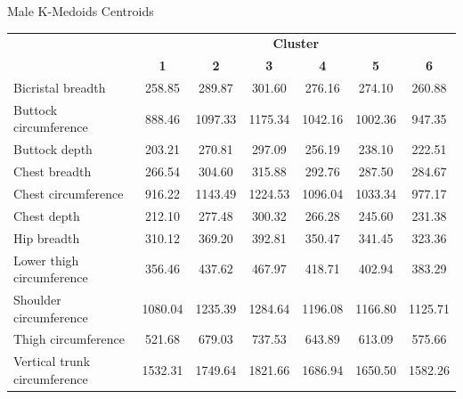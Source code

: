 \documentclass[10pt]{beamer}
\begin{document}
\begin{frame}{Male K-Medoids Centroids}
	\scriptsize
	\centering
	\begin{tabular}{lcccccc}
		\cline{2-7}
		                             & \multicolumn{6}{c}{\textbf{Cluster}}                                                                             \\
		                             & \textbf{1}                           & \textbf{2}   & \textbf{3}   & \textbf{4}   & \textbf{5}    & \textbf{6}   \\
		\hline\hline
		Bicristal breadth            & 258.85                               & 289.87       & 301.60       & 276.16       & 274.10        & 260.88       \\
		Buttock circumference        & 888.46                               & 1097.33      & 1175.34      & 1042.16      & 1002.36       & 947.35       \\
		Buttock depth                & 203.21                               & 270.81       & 297.09       & 256.19       & 238.10        & 222.51       \\
		Chest breadth                & 266.54                               & 304.60       & 315.88       & 292.76       & 287.50        & 284.67       \\
		Chest circumference          & 916.22                               & 1143.49      & 1224.53      & 1096.04      & 1033.34       & 977.17       \\
		Chest depth                  & 212.10                               & 277.48       & 300.32       & 266.28       & 245.60        & 231.38       \\
		Hip breadth                  & 310.12                               & 369.20       & 392.81       & 350.47       & 341.45        & 323.36       \\
		Lower thigh circumference    & 356.46                               & 437.62       & 467.97       & 418.71       & 402.94        & 383.29       \\
		Shoulder circumference       & 1080.04                              & 1235.39      & 1284.64      & 1196.08      & 1166.80       & 1125.71      \\
		Thigh circumference          & 521.68                               & 679.03       & 737.53       & 643.89       & 613.09        & 575.66       \\
		Vertical trunk circumference & 1532.31                              & 1749.64      & 1821.66      & 1686.94      & 1650.50       & 1582.26      \\

\end{tabular}
\end{frame}
\end{document}
